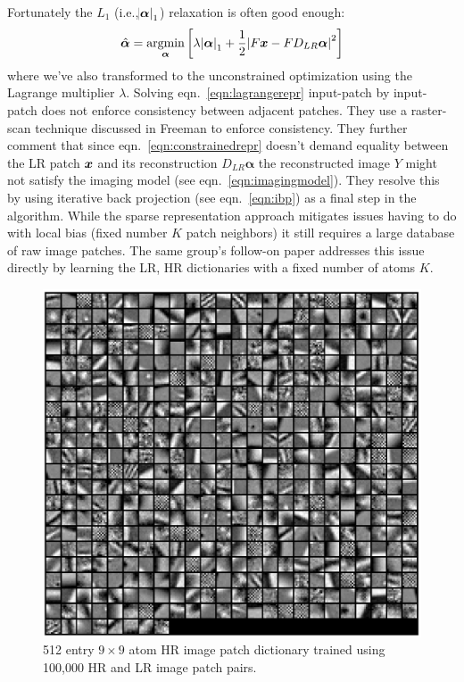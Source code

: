 %
Fortunately the \(L_1\) (i.e.,\(\abs{ \bm{\alpha} }_1\)) relaxation is often good enough\cite{Donoho9446}:
\begin{equation}
    \hat{\bm{\alpha}} = \underset{\bm{\alpha}}{\text{argmin}} \left[ \lambda\abs{ \bm{\alpha} }_1 + \frac{1}{2}\abs{ F\bm{x} - FD_{LR}\bm{\alpha} }^2 \right]
    \label{eqn:lagrangerepr}
\end{equation}
where we've also transformed to the unconstrained optimization using the Lagrange multiplier \(\lambda\).
%
Solving eqn.~\eqref{eqn:lagrangerepr} input-patch by input-patch does not enforce consistency between adjacent patches.
%
They use a raster-scan technique discussed in Freeman \etal\cite{freeman2002example} to enforce consistency.
%
They further comment that since eqn.~\eqref{eqn:constrainedrepr} doesn't demand equality between the LR patch \(\bm{x}\) and its reconstruction \(D_{LR}\bm{\alpha}\) the reconstructed image \(Y\) might not satisfy the imaging model (see eqn.~\eqref{eqn:imagingmodel}).
%
They resolve this by using iterative back projection (see eqn.~\eqref{eqn:ibp}) as a final step in the algorithm.
%
While the sparse representation approach mitigates issues having to do with local bias (fixed number \(K\) patch neighbors) it still requires a large database of raw image patches.
%
The same group's follow-on paper\cite{yang2010} addresses this issue directly by learning the LR, HR dictionaries with a fixed number of atoms \(K\).
\begin{figure}
    \centering
    \includegraphics[width=\linewidth,keepaspectratio]{figures/classical/dictpatches.png}
    \caption{512 entry \(9 \times 9\) atom HR image patch dictionary trained using 100,000 HR and LR image patch pairs\cite{yang2010}.}
    \label{fig:hrpatchdict}
\end{figure}
